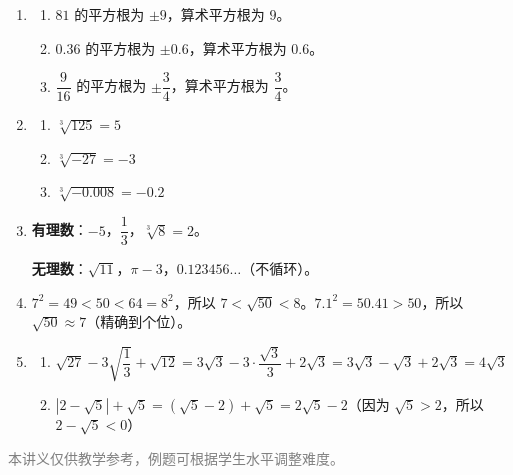 \documentclass[12pt, a4paper]{ctexart}
\begin{document}
\vspace{10pt}
\begin{knowledgebox}[参考答案]
\begin{enumerate}[leftmargin=2em]
  \item \begin{enumerate}[label=(\arabic*)]
    \item $81$ 的平方根为 $\pm 9$，算术平方根为 $9$。
    \item $0.36$ 的平方根为 $\pm 0.6$，算术平方根为 $0.6$。
    \item $\dfrac{9}{16}$ 的平方根为 $\pm\dfrac{3}{4}$，算术平方根为 $\dfrac{3}{4}$。
  \end{enumerate}

  \item \begin{enumerate}[label=(\arabic*)]
    \item $\sqrt[3]{125} = 5$
    \item $\sqrt[3]{-27} = -3$
    \item $\sqrt[3]{-0.008} = -0.2$
  \end{enumerate}

  \item \textbf{有理数}：$-5$，$\dfrac{1}{3}$，$\sqrt[3]{8} = 2$。

  \textbf{无理数}：$\sqrt{11}$，$\pi - 3$，$0.123456\ldots$（不循环）。

  \item $7^2 = 49 < 50 < 64 = 8^2$，所以 $7 < \sqrt{50} < 8$。$7.1^2 = 50.41 > 50$，所以 $\sqrt{50} \approx 7$（精确到个位）。

  \item \begin{enumerate}[label=(\arabic*)]
    \item $\sqrt{27} - 3\sqrt{\dfrac{1}{3}} + \sqrt{12} = 3\sqrt{3} - 3 \cdot \dfrac{\sqrt{3}}{3} + 2\sqrt{3} = 3\sqrt{3} - \sqrt{3} + 2\sqrt{3} = 4\sqrt{3}$

    \item $|2 - \sqrt{5}| + \sqrt{5} = (\sqrt{5} - 2) + \sqrt{5} = 2\sqrt{5} - 2$（因为 $\sqrt{5} > 2$，所以 $2 - \sqrt{5} < 0$）
  \end{enumerate}
\end{enumerate}
\end{knowledgebox}

\vfill
\begin{center}
\small\textcolor{gray}{本讲义仅供教学参考，例题可根据学生水平调整难度。}
\end{center}
\end{document}
